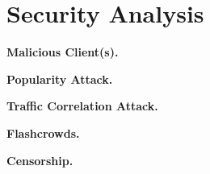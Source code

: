 \section{Security Analysis}
\label{sec:sec}

{\bf Malicious Client(s).}

{\bf Popularity Attack.}

{\bf Traffic Correlation Attack.}

{\bf Flashcrowds.}

{\bf Censorship.}
